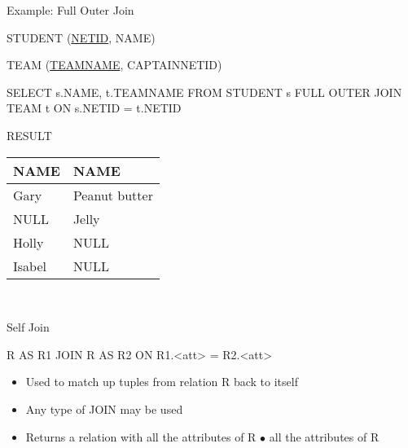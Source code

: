 \documentclass[aspectratio=169]{beamer}
\begin{document}
\begin{frame}[fragile]{Example: Full Outer Join}

STUDENT (\underline{NETID}, NAME)

TEAM (\underline{TEAMNAME}, CAPTAINNETID)

\begin{SQL}
SELECT s.NAME, t.TEAMNAME
FROM STUDENT s FULL OUTER JOIN TEAM t ON s.NETID = t.NETID
\end{SQL}

RESULT\\
\begin{tabular}{|l|l|} \hline
\textbf{NAME} & \textbf{NAME}  \\ \hline
Gary & Peanut butter \\\hline
NULL & Jelly \\\hline
 Holly & NULL  \\ \hline
 Isabel & NULL  \\ \hline
\end{tabular}\\

\end{frame}

\begin{frame}[fragile]{Self Join}

\begin{SQL}
R AS R1 JOIN R AS R2 ON R1.<att> = R2.<att>
\end{SQL}

\begin{itemize}
\item Used to match up tuples from relation R back to itself
\item Any type of JOIN may be used 
\item Returns a relation with all the attributes of R $\bullet$ all the attributes of R
\end{itemize}
\end{frame}
\end{document}
